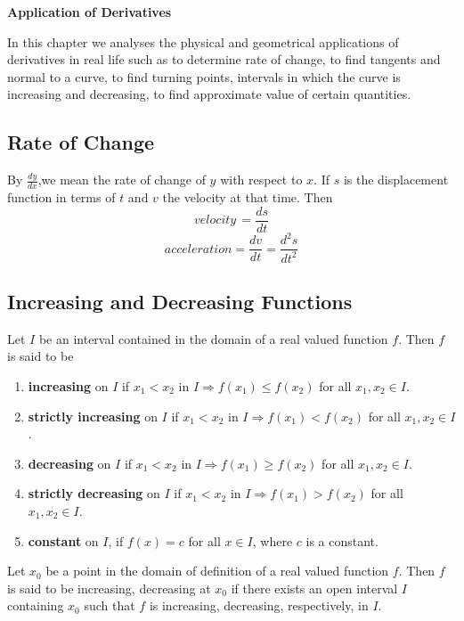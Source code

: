 \documentclass[12pt]{article}
\begin{document}
\begin{center}
    {\LARGE \textbf{Application of Derivatives} }
\end{center}


    In this chapter we analyses the physical and geometrical applications of derivatives in real life such as to determine rate of change, to find tangents and normal to a curve, to find turning points, intervals in which the curve is increasing and decreasing, to find approximate value of certain quantities.
    \subsection*{Rate of Change}
    By $\frac{dy}{dx}$,we mean the rate of change of $y$ with respect to $x$. If $s$ is the displacement function in terms of $t$ and $v$ the velocity at that time. Then $$velocity\, = \frac{ds}{dt}$$  $$acceleration = \frac{dv}{dt}=\frac{d^2 s}{dt^2}$$

    \subsection*{Increasing and Decreasing Functions}
    Let $I$ be an interval contained in the domain of a real valued function $f$.
Then $f$ is said to be \begin{enumerate}
    \item  \textbf{increasing} on $I$ if $x_1 < x_2$ in $I \Rightarrow f(x_1) \leq f(x_2)$ for all $x_1, x_2 \in I$.
    \item \textbf{strictly increasing}  on $I$ if $x_1 < x_2$ in $I \Rightarrow f(x_1) < f(x_2)$ for all $x_1, x_2 \in I$.
    \item  \textbf{decreasing} on $I$ if $x_1 < x_2$ in $I \Rightarrow f(x_1) \geq f(x_2)$ for all $x_1, x_2 \in I$.
    \item  \textbf{strictly decreasing} on $I$ if $x_1 < x_2$ in $I \Rightarrow f(x_1) > f(x_2)$ for all $x_1, x_2 \in I$.

    \item  \textbf{constant} on $I$, if $f(x) = c$ for all $x \in I$, where $c$ is a constant.
    
\end{enumerate}
Let $x_0$ be a point in the domain of definition of a real valued function $f$.
    Then $f$ is said to be increasing, decreasing at $x_0$ if there exists an open interval $I$
    containing $x_0$ such that $f$ is increasing, decreasing, respectively, in $I$.
\end{document}
